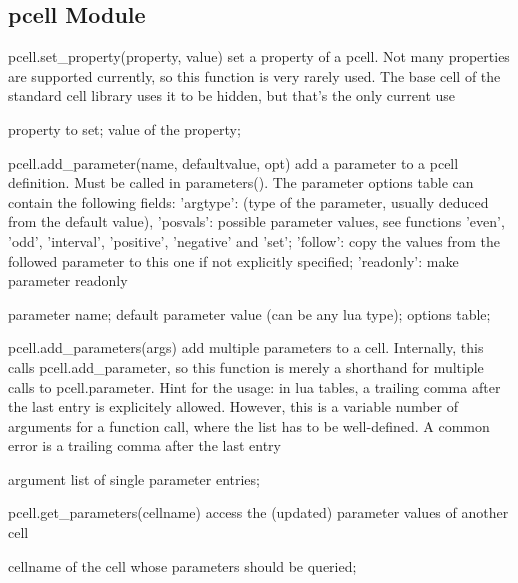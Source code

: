 \subsection{pcell Module}
\begin{APIfunc}{pcell.set\_property(property, value)}
    set a property of a pcell. Not many properties are supported currently, so this function is very rarely used. The base cell of the standard cell library uses it to be hidden, but that's the only current use
    \begin{APIparameters}
            property to set;
            value of the property;
    \end{APIparameters}
\end{APIfunc}
\begin{APIfunc}{pcell.add\_parameter(name, defaultvalue, opt)}
    add a parameter to a pcell definition. Must be called in parameters(). The parameter options table can contain the following fields: 'argtype': (type of the parameter, usually deduced from the default value), 'posvals': possible parameter values, see functions 'even', 'odd', 'interval', 'positive', 'negative' and 'set'; 'follow': copy the values from the followed parameter to this one if not explicitly specified; 'readonly': make parameter readonly
    \begin{APIparameters}
            parameter name;
            default parameter value (can be any lua type);
            options table;
    \end{APIparameters}
\end{APIfunc}
\begin{APIfunc}{pcell.add\_parameters(args)}
    add multiple parameters to a cell. Internally, this calls pcell.add\_parameter, so this function is merely a shorthand for multiple calls to pcell.parameter. Hint for the usage: in lua tables, a trailing comma after the last entry is explicitely allowed. However, this is a variable number of arguments for a function call, where the list has to be well-defined. A common error is a trailing comma after the last entry
    \begin{APIparameters}
            argument list of single parameter entries;
    \end{APIparameters}
\end{APIfunc}
\begin{APIfunc}{pcell.get\_parameters(cellname)}
    access the (updated) parameter values of another cell
    \begin{APIparameters}
            cellname of the cell whose parameters should be queried;
    \end{APIparameters}
\end{APIfunc}
